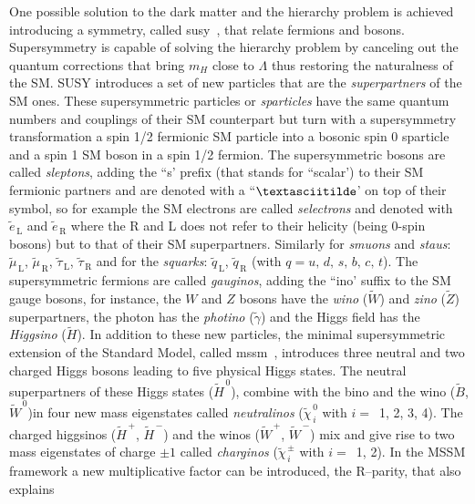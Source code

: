 One possible solution to the dark matter and the hierarchy problem is achieved
introducing a symmetry, called \gls{susy}~\cite{SUSYIntro}, that relate fermions
and bosons. Supersymmetry is capable of solving the hierarchy problem by
canceling out the quantum corrections that bring $m_H$ close to $\Lambda$ thus
restoring the naturalness of the SM\@. SUSY introduces a set of new particles
that are the \emph{superpartners} of the SM ones. These supersymmetric particles
or \emph{sparticles} have the same quantum numbers and couplings of their SM
counterpart but turn with a supersymmetry transformation a spin 1/2 fermionic SM
particle into a bosonic spin 0 sparticle and a spin 1 SM boson in a spin 1/2
fermion. The supersymmetric bosons are called \emph{sleptons}, adding the ``s'
prefix (that stands for ``scalar') to their SM fermionic partners and are
denoted with a ``$\textasciitilde$' on top of their symbol, so for example the
SM electrons are called \emph{selectrons} and denoted with
$\tilde{e}_\mathrm{\, L}$ and $\tilde{e}_\mathrm{\, R}$ where the R and L does
not refer to their helicity (being 0-spin bosons) but to that of their SM
superpartners. Similarly for \emph{smuons} and \emph{staus}:
$\tilde{\mu}_\mathrm{\, L}$, $\tilde{\mu}_\mathrm{\, R}$,
$\tilde{\tau}_\mathrm{\, L}$, $\tilde{\tau}_\mathrm{\, R}$ and for the
\emph{squarks}: $\tilde{q}_\mathrm{\, L}$, $\tilde{q}_\mathrm{\, R}$ (with
$q = u,\, d,\, s,\, b,\, c,\, t$). The supersymmetric fermions are called
\emph{gauginos}, adding the ``ino' suffix to the SM gauge bosons, for instance,
the $W$ and $Z$ bosons have the \emph{wino} ($\widetilde{W}$) and \emph{zino}
($\widetilde{Z}$) superpartners, the photon has the \emph{photino}
($\widetilde{\gamma}$) and the Higgs field has the \emph{Higgsino}
($\widetilde{H}$). In addition to these new particles, the minimal
supersymmetric extension of the Standard Model, called
\gls{mssm}~\cite{MSSMIntro}, introduces three neutral and two charged Higgs
bosons leading to five physical Higgs states. The neutral superpartners of these
Higgs states ($\widetilde{H}^{\, 0}$), combine with the bino and the wino
($\widetilde{B}$, $\widetilde{W}^{\, 0}$)in four new mass eigenstates called
\emph{neutralinos} ($\widetilde{\chi}^{\, 0}_{\, i}$ with $i = $~1, 2, 3,
4). The charged higgsinos ($\widetilde{H}^{\, +}$, $\widetilde{H}^{\, -}$) and
the winos ($\widetilde{W}^{\, +}$, $\widetilde{W}^{\, -}$) mix and give rise to
two mass eigenstates of charge $\pm 1$ called \emph{charginos}
($\widetilde{\chi}^{\, \pm}_{\, i}$ with $i = $~1, 2). In the MSSM framework a
new multiplicative factor can be introduced, the R--parity, that also explains
